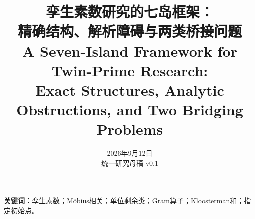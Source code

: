 \documentclass[UTF8,fontset=fandol,11pt,a4paper]{ctexart}
\title{孪生素数研究的七岛框架：\\精确结构、解析障碍与两类桥接问题\\[5pt]
\large A Seven-Island Framework for Twin-Prime Research:\\
Exact Structures, Analytic Obstructions, and Two Bridging Problems}
\author{}
\date{2026年9月12日\\统一研究母稿 v0.1}
\theoremstyle{definition}
\theoremstyle{remark}
\begin{document}
\pagestyle{plain}
\maketitle
\begin{abstract}

\end{abstract}
\noindent\textbf{关键词：}孪生素数；Möbius相关；单位剩余类；Gram算子；Kloosterman和；指定初始点。
\clearpage
\setcounter{tocdepth}{1}
\tableofcontents
\clearpage









\clearpage
\appendix


{}
\begingroup
\raggedright


\endgroup
\end{document}
